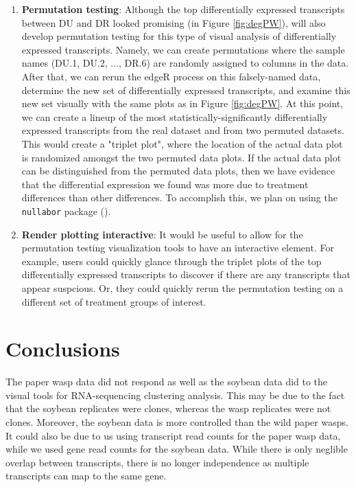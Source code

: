 \documentclass[11pt,a4paper,oldfontcommands,openany]{memoir}
\numberwithin{equation}{section} %
\newcommand{\pkg}[1]{{\texttt{#1}}}
\begin{document}
\begin{enumerate}
\item \textbf{Permutation testing}: Although the top differentially expressed transcripts between DU and DR looked promising (in Figure \ref{fig:degPW}), will also develop permutation testing for this type of visual analysis of differentially expressed transcripts. Namely, we can create permutations where the sample names (DU.1, DU.2, ..., DR.6) are randomly assigned to columns in the data. After that, we can rerun the edgeR process on this falsely-named data, determine the new set of differentially expressed transcripts, and examine this new set visually with the same plots as in Figure \ref{fig:degPW}. At this point, we can create a lineup of the most statistically-significantly differentially expressed transcripts from the real dataset and from two permuted datasets. This would create a "triplet plot", where the location of the actual data plot is randomized amongst the two permuted data plots. If the actual data plot can be distinguished from the permuted data plots, then we have evidence that the differential expression we found was more due to treatment differences than other differences. To accomplish this, we plan on using the \pkg{nullabor} package (\citealt{nullabor}).

\item \textbf{Render plotting interactive}: It would be useful to allow for the permutation testing visualization tools to have an interactive element. For example, users could quickly glance through the triplet plots of the top differentially expressed transcripts to discover if there are any transcripts that appear suspcious. Or, they could quickly rerun the permutation testing on a different set of treatment groups of interest.

\end{enumerate}

\section{Conclusions}

The paper wasp data did not respond as well as the soybean data did to the visual tools for RNA-sequencing clustering analysis. This may be due to the fact that the soybean replicates were clones, whereas the wasp replicates were not clones. Moreover, the soybean data is more controlled than the wild paper wasps. It could also be due to us using transcript read counts for the paper wasp data, while we used gene read counts for the soybean data. While there is only neglible overlap between transcripts, there is no longer independence as multiple transcripts can map to the same gene.
\end{document}
